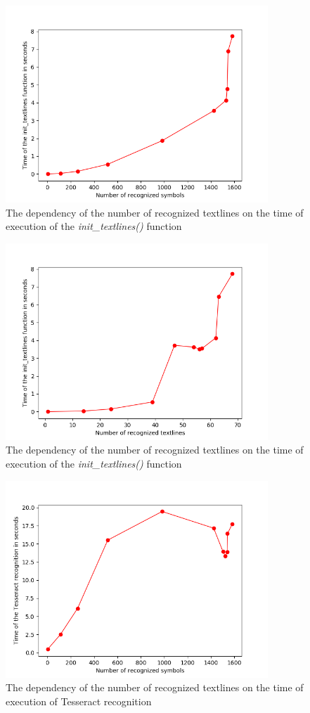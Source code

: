 \begin{figure}
\centering
\includegraphics[height=20em]{img/results/symbolsTimeInit.png}
\caption{The dependency of the number of recognized textlines on the time of execution of the \emph{init\_textlines()} function}
\label{fig:dpiSpeed}
\end{figure}

\begin{figure}
\centering
\includegraphics[height=20em]{img/results/textlinesTimeInit.png}
\caption{The dependency of the number of recognized textlines on the time of execution of the \emph{init\_textlines()} function}
\label{fig:dpiSpeed}
\end{figure}

\begin{figure}
\centering
\includegraphics[height=20em]{img/results/symbolsTimeTesseract.png}
\caption{The dependency of the number of recognized textlines on the time of execution of Tesseract recognition}
\label{fig:dpiSpeed}
\end{figure}

